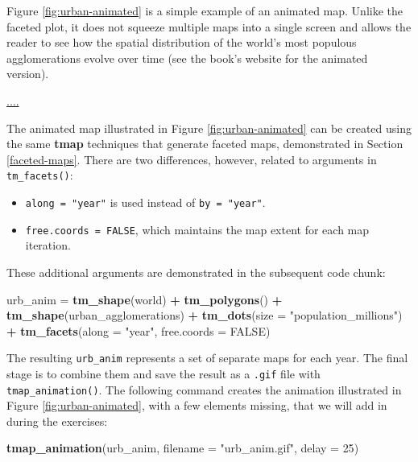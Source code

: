\documentclass[]{krantz}
\newenvironment{Shaded}{\begin{snugshade}}{\end{snugshade}}
\newcommand{\DataTypeTok}[1]{\textcolor[rgb]{0.27,0.27,0.27}{#1}}
\newcommand{\DecValTok}[1]{\textcolor[rgb]{0.06,0.06,0.06}{#1}}
\newcommand{\KeywordTok}[1]{\textcolor[rgb]{0.27,0.27,0.27}{\textbf{#1}}}
\newcommand{\NormalTok}[1]{#1}
\newcommand{\OperatorTok}[1]{\textcolor[rgb]{0.43,0.43,0.43}{\textbf{#1}}}
\newcommand{\OtherTok}[1]{\textcolor[rgb]{0.37,0.37,0.37}{#1}}
\newcommand{\StringTok}[1]{\textcolor[rgb]{0.5,0.5,0.5}{#1}}
\providecommand{\tightlist}{%
  \setlength{\itemsep}{0pt}\setlength{\parskip}{0pt}}
\begin{document}
Figure \ref{fig:urban-animated} is a simple example of an animated map.
Unlike the faceted plot, it does not squeeze multiple maps into a single screen and allows the reader to see how the spatial distribution of the world's most populous agglomerations evolve over time (see the book's website for the animated version).

\url{....}

The animated map illustrated in Figure \ref{fig:urban-animated} can be created using the same \textbf{tmap} techniques that generate faceted maps, demonstrated in Section \ref{faceted-maps}.
There are two differences, however, related to arguments in \texttt{tm\_facets()}:

\begin{itemize}
\tightlist
\item
  \texttt{along\ =\ "year"} is used instead of \texttt{by\ =\ "year"}.
\item
  \texttt{free.coords\ =\ FALSE}, which maintains the map extent for each map iteration.
\end{itemize}

These additional arguments are demonstrated in the subsequent code chunk:

\begin{Shaded}
\begin{Highlighting}[]
\NormalTok{urb_anim =}\StringTok{ }\KeywordTok{tm_shape}\NormalTok{(world) }\OperatorTok{+}\StringTok{ }\KeywordTok{tm_polygons}\NormalTok{() }\OperatorTok{+}\StringTok{ }
\StringTok{  }\KeywordTok{tm_shape}\NormalTok{(urban_agglomerations) }\OperatorTok{+}\StringTok{ }\KeywordTok{tm_dots}\NormalTok{(}\DataTypeTok{size =} \StringTok{"population_millions"}\NormalTok{) }\OperatorTok{+}
\StringTok{  }\KeywordTok{tm_facets}\NormalTok{(}\DataTypeTok{along =} \StringTok{"year"}\NormalTok{, }\DataTypeTok{free.coords =} \OtherTok{FALSE}\NormalTok{)}
\end{Highlighting}
\end{Shaded}

The resulting \texttt{urb\_anim} represents a set of separate maps for each year.
The final stage is to combine them and save the result as a \texttt{.gif} file with \texttt{tmap\_animation()}.
The following command creates the animation illustrated in Figure \ref{fig:urban-animated}, with a few elements missing, that we will add in during the exercises:

\begin{Shaded}
\begin{Highlighting}[]
\KeywordTok{tmap_animation}\NormalTok{(urb_anim, }\DataTypeTok{filename =} \StringTok{"urb_anim.gif"}\NormalTok{, }\DataTypeTok{delay =} \DecValTok{25}\NormalTok{)}
\end{Highlighting}
\end{Shaded}
\end{document}
